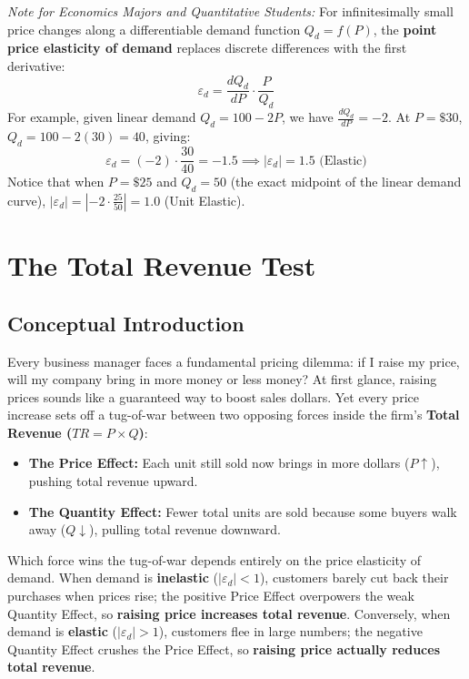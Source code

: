 \documentclass[11pt,letterpaper]{article}
\begin{document}
\begin{tcolorbox}[colback=CourseBlue!6!white,colframe=CourseBlue,title=\textbf{Optional Advanced Section: Point Elasticity via Calculus}]
\small
\emph{Note for Economics Majors and Quantitative Students:}
For infinitesimally small price changes along a differentiable demand function $Q_d = f(P)$, the \textbf{point price elasticity of demand} replaces discrete differences with the first derivative:
\[
\varepsilon_d = \frac{dQ_d}{dP} \cdot \frac{P}{Q_d}
\]
For example, given linear demand $Q_d = 100 - 2P$, we have $\frac{dQ_d}{dP} = -2$. At $P = \$30$, $Q_d = 100 - 2(30) = 40$, giving:
\[
\varepsilon_d = (-2) \cdot \frac{30}{40} = -1.5 \implies |\varepsilon_d| = 1.5 \text{ (Elastic)}
\]
Notice that when $P = \$25$ and $Q_d = 50$ (the exact midpoint of the linear demand curve), $|\varepsilon_d| = |-2 \cdot \frac{25}{50}| = 1.0$ (Unit Elastic).
\end{tcolorbox}

\section{The Total Revenue Test}

\subsection*{Conceptual Introduction}
Every business manager faces a fundamental pricing dilemma: if I raise my price, will my company bring in more money or less money? At first glance, raising prices sounds like a guaranteed way to boost sales dollars. Yet every price increase sets off a tug-of-war between two opposing forces inside the firm's \textbf{Total Revenue ($TR = P \times Q$)}:
\begin{itemize}
    \item \textbf{The Price Effect:} Each unit still sold now brings in more dollars ($P \uparrow$), pushing total revenue upward.
    \item \textbf{The Quantity Effect:} Fewer total units are sold because some buyers walk away ($Q \downarrow$), pulling total revenue downward.
\end{itemize}

Which force wins the tug-of-war depends entirely on the price elasticity of demand. When demand is \textbf{inelastic} ($|\varepsilon_d| < 1$), customers barely cut back their purchases when prices rise; the positive Price Effect overpowers the weak Quantity Effect, so \textbf{raising price increases total revenue}. Conversely, when demand is \textbf{elastic} ($|\varepsilon_d| > 1$), customers flee in large numbers; the negative Quantity Effect crushes the Price Effect, so \textbf{raising price actually reduces total revenue}.
\end{document}
